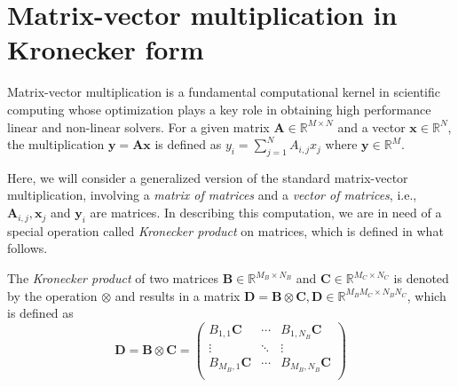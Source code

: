 \documentclass{article}
\newcommand{\mat}[1]{\mathbf{#1}}
\renewcommand{\vec}[1]{\mathbf{#1}}
\newcommand{\R}{\mathbb{R}}
\begin{document}
\section{Matrix-vector multiplication in Kronecker form}

Matrix-vector multiplication is a fundamental computational kernel in scientific computing whose optimization plays a key role in obtaining high performance linear and non-linear solvers.
For a given matrix $\mat{A} \in \R^{M \times N}$ and a vector $\vec{x} \in \R^{N}$, the multiplication $\vec{y} = \mat{A} \vec{x}$ is defined as $y_i = \sum_{j = 1}^{N} A_{i, j} x_j$ where $\vec{y} \in \R^{M}$.

Here, we will consider a generalized version of the standard matrix-vector multiplication, involving a \textit{matrix of matrices} and a \textit{vector of matrices}, i.e., $\mat{A}_{i, j}, \mat{x}_j$ and $\mat{y}_i$ are matrices.
In describing this computation, we are in need of a special operation called \textit{Kronecker product} on matrices, which is defined in what follows.

The \emph{Kronecker product} of two matrices $\mat{B} \in \R^{M_B \times N_B}$ and $\mat{C} \in \R^{M_C \times N_C}$ is denoted by the operation $\otimes$ and results in a matrix $\mat{D} = \mat{B} \otimes \mat{C}, \mat{D} \in \R^{M_B M_C \times N_B N_C}$, which is defined as
\begin{equation}
  \mat{D} = \mat{B} \otimes \mat{C} = 
  \begin{pmatrix}
    B_{1,1} \mat{C}    & \cdots & B_{1, N_B} \mat{C}   \\
    \vdots       & \ddots & \vdots         \\
    B_{M_B, 1} \mat{C} & \cdots & B_{M_B, N_B} \mat{C} \\
  \end{pmatrix}
  \label{eq:kron}
\end{equation}
\end{document}
